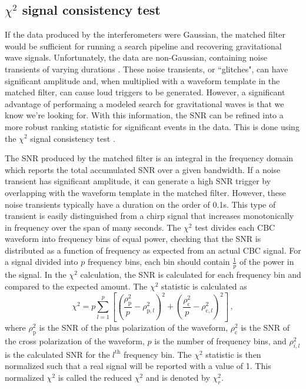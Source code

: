 \subsection{$\chi^{2}$ signal consistency test}\label{sec:chisq}

If the data produced by the interferometers were Gaussian, the matched filter would 
be sufficient for running a search pipeline and recovering gravitational wave signals. 
Unfortunately, the data are non-Gaussian, containing noise transients of varying 
durations \cite{Nuttall:2015dqa,GW150914-DETCHAR}. These noise transients, 
or ``glitches", can have significant amplitude 
and, when multiplied with a waveform template in the matched filter, can cause 
loud triggers to be generated. 
However, a significant advantage of performaing a modeled search for gravitational 
waves is that 
we know we're looking for. With this information, the SNR can be refined into a more 
robust ranking statistic for significant events in the data. This is done using the 
$\chi^{2}$ signal consistency test \cite{Allen:2004gu}. 

The SNR produced by the matched filter is an integral in the frequency domain which 
reports the total accumulated SNR over a given bandwidth. If a noise transient has 
significant amplitude, it can generate a high SNR trigger by overlapping with the 
waveform template in the matched filter. However, these noise 
transients typically have a duration on the order of 0.1s. This type of transient 
is easily distinguished from a chirp signal that increases monotonically in frequency 
over the span of many seconds. 
The $\chi^{2}$ test divides each CBC waveform into
frequency bins of equal power, checking that the SNR is distributed as a 
function of frequency
as expected from an actual CBC signal.
For a signal divided into $p$ frequency bins, each bin should contain $\frac{1}{p}$ of the power in the 
signal. 
In the $\chi^2$ calculation, the SNR is calculated for each frequency bin and compared to the expected 
amount. The $\chi^2$ statistic is calculated as \cite{Usman:2015kfa}
\begin{equation}
\chi^2 = p\displaystyle\sum_{l=1}^{p}\left[\left(\frac{\rho_\mathrm{p}^2}{p}-\rho_{\mathrm{p},l}^2\right)^2 + \left(\frac{\rho^2_\mathrm{c}}{p}-\rho_{\mathrm{c},l}^2\right)^2 \right] \, ,
\label{eq:chisqr}
\end{equation}
where $\rho^2_\mathrm{p}$ is the SNR of the plus polarization of the waveform, $\rho^2_\mathrm{c}$ 
is the SNR of the cross 
polarization of the waveform, $p$ is the number of frequency bins, and 
$\rho^2_{i,l}$ is the calculated SNR for the $l^\mathrm{th}$ frequency bin.
The $\chi^2$ statistic is then normalized such that a real signal will be reported with a value of 1. 
This normalized $\chi^2$ is called the reduced $\chi^2$ and is denoted by $\chi^2_r$.

